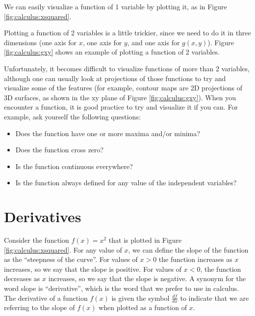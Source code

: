 We can easily visualize a function of 1 variable by plotting it, as in Figure \ref{fig:calculus:xsquared}.

Plotting a function of 2 variables is a little trickier, since we need to do it in three dimensions (one axis for $x$, one axis for $y$, and one axis for $g(x,y)$). Figure \ref{fig:calculus:gxy} shows an example of plotting a function of 2 variables.

Unfortunately, it becomes difficult to visualize functions of more than 2 variables, although one can usually look at projections of those functions to try and visualize some of the features (for example, contour maps are 2D projections of 3D surfaces, as shown in the xy plane of Figure \ref{fig:calculus:gxy}). When you encounter a function, it is good practice to try and visualize it if you can. For example, ask yourself the following questions:
\begin{itemize}
\item Does the function have one or more maxima and/or minima?
\item Does the function cross zero?
\item Is the function continuous everywhere?
\item Is the function always defined for any value of the independent variables?
\end{itemize} 

\section{Derivatives}
Consider the function $f(x)=x^2$ that is plotted in Figure \ref{fig:calculus:xsquared}. For any value of $x$, we can define the slope of the function as the ``steepness of the curve''. For values of $x>0$ the function increases as $x$ increases, so we say that the slope is positive. For values of $x<0$, the function decreases as $x$ increases, so we say that the slope is negative. A synonym for the word slope is ``derivative'', which is the word that we prefer to use in calculus. The derivative of a function $f(x)$ is given the symbol $\frac{df}{dx}$ to indicate that we are referring to the slope of $f(x)$ when plotted as a function of $x$. 

